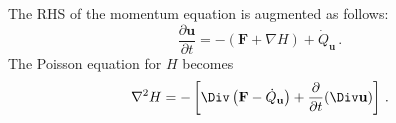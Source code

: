 \documentclass[11pt]{book}
\begin{document}

The RHS of the momentum equation is augmented as follows:
\begin{equation}
\label{eqn_mms_u_eqn}
\frac{\partial \mathbf{u}}{\partial t} = - ( \mathbf{F} + \nabla H ) + \dot{Q}_{\mathbf{u}} \,\mbox{.}
\end{equation}
The Poisson equation for $H$ becomes
\begin{align}
\label{eqn_poisson_mms}
\nabla^2 H = - \left[ \Div \left( \mathbf{F} - \dot{Q}_{\mathbf{u}} \right) + \frac{\partial}{\partial t} (\Div\mathbf{u}) \right] \,\mbox{.}
\end{align}

\end{document}
